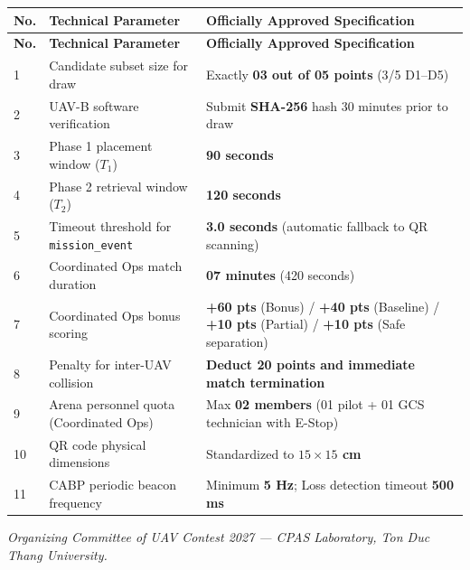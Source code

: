 \documentclass[12pt,a4paper]{article}
\begin{document}
\begin{longtable}{p{1.0cm}p{6.5cm}p{6.5cm}}
\toprule
\textbf{No.} & \textbf{Technical Parameter} & \textbf{Officially Approved Specification} \\
\midrule
\endfirsthead
\toprule
\textbf{No.} & \textbf{Technical Parameter} & \textbf{Officially Approved Specification} \\
\midrule
\endhead
1 & Candidate subset size for draw & Exactly \textbf{03 out of 05 points} (3/5 D1–D5) \\
2 & UAV-B software verification & Submit \textbf{SHA-256} hash 30 minutes prior to draw \\
3 & Phase 1 placement window ($T_1$) & \textbf{90 seconds} \\
4 & Phase 2 retrieval window ($T_2$) & \textbf{120 seconds} \\
5 & Timeout threshold for \texttt{mission\_event} & \textbf{3.0 seconds} (automatic fallback to QR scanning) \\
6 & Coordinated Ops match duration & \textbf{07 minutes} (420 seconds) \\
7 & Coordinated Ops bonus scoring & \textbf{+60 pts} (Bonus) / \textbf{+40 pts} (Baseline) / \textbf{+10 pts} (Partial) / \textbf{+10 pts} (Safe separation) \\
8 & Penalty for inter-UAV collision & \textbf{Deduct 20 points and immediate match termination} \\
9 & Arena personnel quota (Coordinated Ops) & Max \textbf{02 members} (01 pilot + 01 GCS technician with E-Stop) \\
10 & QR code physical dimensions & Standardized to \textbf{$15 \times 15$ cm} \\
11 & CABP periodic beacon frequency & Minimum \textbf{5 Hz}; Loss detection timeout \textbf{500 ms} \\
\bottomrule
\end{longtable}

\vspace{1cm}
\noindent\textit{Organizing Committee of UAV Contest 2027 — CPAS Laboratory, Ton Duc Thang University.}
\end{document}
